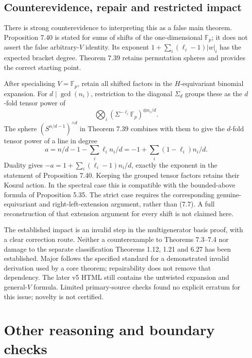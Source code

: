 \documentclass[10pt]{article}
\begin{document}
\subsection*{Counterevidence, repair and restricted impact}
There is strong counterevidence to interpreting this as a false main theorem. Proposition 7.40 is stated for sums of shifts of the one-dimensional \(\mathbb F_p\); it does not assert the false arbitrary-\(V\) identity. Its exponent \(1+\sum_i(\ell_i-1)|w|_i\) has the expected bracket degree. Theorem 7.39 retains permutation spheres and provides the correct starting point.\par
After specialising \(V=\mathbb F_p\), retain all shifted factors in the \(H\)-equivariant binomial expansion. For \(d\mid\gcd(n_i)\), restriction to the diagonal \(\Sigma_d\) groups these as the \(d\)-fold tensor power of \[\bigotimes_i(\Sigma^{-\ell_i}\mathbb F_p)^{\otimes n_i/d}.\] The sphere \((S^{n/d-1})^{\wedge d}\) in Theorem 7.39 combines with them to give the \(d\)-fold tensor power of a line in degree \[a=n/d-1-\sum_i\ell_i n_i/d
   =-1+\sum_i(1-\ell_i)n_i/d.\] Duality gives \(-a=1+\sum_i(\ell_i-1)n_i/d\), exactly the exponent in the statement of Proposition 7.40. Keeping the grouped tensor factors retains their Koszul action. In the spectral case this is compatible with the bounded-above formula of Proposition 5.35. The strict case requires the corresponding genuine-equivariant and right-left-extension argument, rather than (7.7). A full reconstruction of that extension argument for every shift is not claimed here.\par
The established impact is an invalid step in the multigenerator basis proof, with a clear correction route. Neither a counterexample to Theorems 7.3–7.4 nor damage to the separate classification Theorems 1.12, 1.21 and 6.27 has been established. Major follows the specified standard for a demonstrated invalid derivation used by a core theorem; repairability does not remove that dependency. The later v5 HTML still contains the untwisted expansion and general-\(V\) formula. Limited primary-source checks found no explicit erratum for this issue; novelty is not certified.\par
\section*{Other reasoning and boundary checks}
\end{document}
